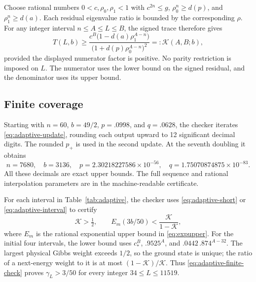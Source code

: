 \documentclass[11pt,a4paper]{article}
\newcommand{\gap}{\gamma}
\begin{document}
Choose rational numbers $0<c,\rho_0,\rho_1<1$ with
$c^{2n}\le g$, $\rho_0^n\ge d(p)$, and $\rho_1^n\ge d(a)$.
Each residual eigenvalue ratio is bounded by the corresponding $\rho$.
For any integer interval $n\le A\le L\le B$, the signed trace therefore gives
\begin{equation}\label{eq:adaptive-interval}
 T(L,b)\ge
 \frac{c^B\bigl(1-d(a)\rho_1^{A-n}\bigr)}
      {\bigl(1+d(p)\rho_0^{A-n}\bigr)^2}
 =:\mathcal K(A,B;b),
\end{equation}
provided the displayed numerator factor is positive. No parity
restriction is imposed on $L$. The numerator uses the lower bound on
the signed residual, and the denominator uses its upper bound.

\subsection{Finite coverage}
Starting with $n=60$, $b=49/2$, $p=.0998$, and $q=.0628$, the checker
iterates \eqref{eq:adaptive-update}, rounding each output upward to
12 significant decimal digits. The rounded $p_+$ is used in the
second update. At the seventh doubling it obtains
\begin{equation}\label{eq:adaptive-tail-seed}
 n=7680,\quad b=3136,\quad
 p=2.30218227586\times10^{-56},\quad
 q=1.75070874875\times10^{-83}.
\end{equation}
All these decimals are exact upper bounds. The full sequence and
rational interpolation parameters are in the machine-readable certificate.

For each interval in Table~\ref{tab:adaptive}, the checker uses
\eqref{eq:adaptive-short} or \eqref{eq:adaptive-interval} to certify
\begin{equation}\label{eq:adaptive-finite-check}
 \mathcal K>\tfrac12,\qquad
 E_m(3b/50)<\frac{\mathcal K}{1-\mathcal K},
\end{equation}
where $E_m$ is the rational exponential upper bound in
\eqref{eq:expupper}. For the initial four intervals, the lower bound
uses $c_*^B$, $.9525^A$, and $.0442\,.874^{A-32}$.
The largest physical Gibbs weight exceeds $1/2$, so the ground state
is unique; the ratio of a next-energy weight to it is at most
$(1-\mathcal K)/\mathcal K$. Thus \eqref{eq:adaptive-finite-check}
proves $\gap_L>3/50$ for every integer $34\le L\le11519$.
\end{document}
